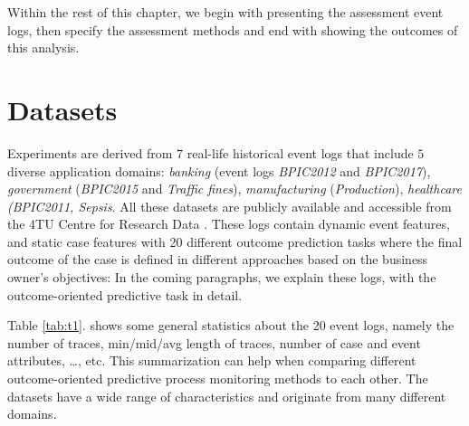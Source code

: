 
Within the rest of this chapter, we begin with presenting the assessment event logs, then specify the assessment methods and end with showing the outcomes of this analysis.


\ifpdf
    \graphicspath{{X/figures/PNG/}{X/figures/PDF/}{X/figures/}}
\else
    \graphicspath{{X/figures/EPS/}{X/figures/}}
\fi


%	
%

\section{Datasets}
Experiments are derived from $7$ real-life historical event logs that include $5$ diverse application domains: \textit{banking} (event logs \textit{BPIC2012} and \textit{BPIC2017}), \textit{government} (\textit{BPIC2015} and \textit{Traffic fines}), \textit{manufacturing} (\textit{Production}), \textit{healthcare (BPIC2011, Sepsis}. All these datasets are publicly available and accessible from the 4TU Centre for Research Data \cite{4TU}. These logs contain dynamic event features, and static case features with 20 different outcome prediction tasks \cite{teinemaa2019outcome} where the final outcome of the case is defined in different approaches based on the business owner's objectives:  In the coming paragraphs, we explain these logs, with the outcome-oriented predictive task in detail.

Table \ref{tab:t1}. shows some general statistics about the 20 event logs, namely the number of traces, min/mid/avg length of traces, number of case and event attributes, …, etc. This summarization can help when comparing different outcome-oriented predictive process monitoring methods to each other. The datasets have a wide range of characteristics and originate from many different domains.



